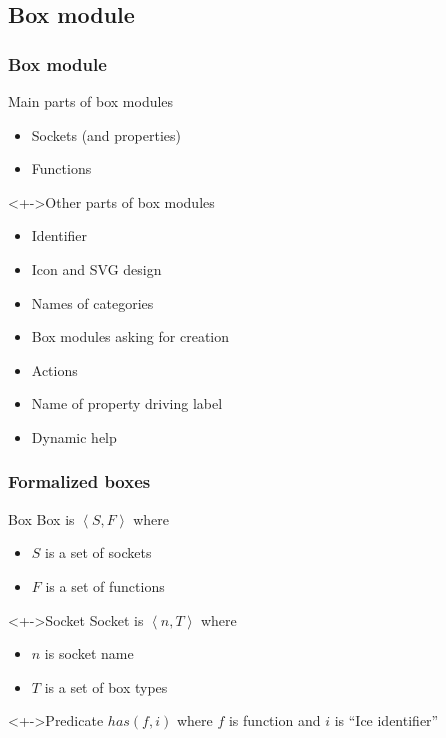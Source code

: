 \documentclass[handout]{beamer}
\begin{document}
\subsection{Box module}
\begin{frame}
	\frametitle{Box module}
	\begin{block}{Main parts of box modules}
		\begin{itemize}[<+->]
			\item Sockets (and properties)
			\item Functions
		\end{itemize}
	\end{block}
	
	\begin{block}<+->{Other parts of box modules}
		\begin{itemize}[<+->]
			\item Identifier
			\item Icon and SVG design
			\item Names of categories
			\item Box modules asking for creation
			\item Actions
			\item Name of property driving label
			\item Dynamic help
		\end{itemize}
	\end{block}
\end{frame}

\begin{frame}
	\frametitle{Formalized boxes}
	\begin{block}{Box}
		Box is $\left<S,F\right>$ where
		\begin{itemize}[<+->]
			\item $S$ is a set of sockets
			\item $F$ is a set of functions
		\end{itemize}
	\end{block}	
	\begin{block}<+->{Socket}
		Socket is $\left<n,T\right>$ where
		\begin{itemize}[<+->]
			\item $n$ is socket name
			\item $T$ is a set of box types
		\end{itemize}
	\end{block}
	\begin{block}<+->{Predicate}
		$has(f,i)$ where $f$ is function and $i$ is ``Ice identifier''
	\end{block}
\end{frame}
\end{document}
